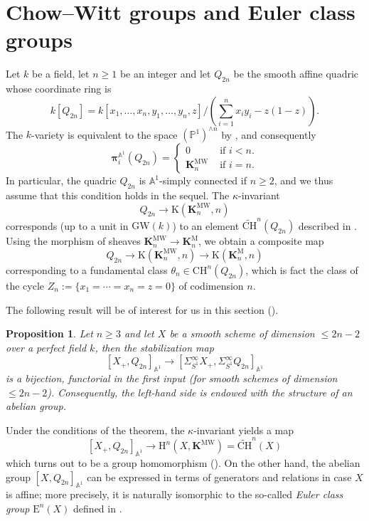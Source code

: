 \documentclass[11pt,leqno]{amsart}
\newcommand{\A}{{\mathbb A}}
\newcommand{\aone}{{\mathbb A}^1}
\newcommand{\pone}{{\mathbb P}^1}
\renewcommand{\1}{{\rm 1\hspace*{-0.4ex}%
\rule{0.1ex}{1.52ex}\hspace*{0.2ex}}}
\newcommand{\bpi}{\bm{\pi}}
\newcommand{\piaone}{{\bpi}^{\aone}}
\newcommand{\CHW}{{\widetilde{\mathrm{CH}}}}
\newcommand{\CH}{{\mathrm{CH}}}
\newcommand{\K}{{{\mathbf K}}}
\newcommand{\KMW}{\K^{\mathrm{MW}}}
\newcommand{\KM}{\K^{\mathrm M}}
\newcommand{\Hr}{{\mathrm {H}}}
\newcommand{\<}[1]{{\langle}#1 {\rangle}}
\theoremstyle{plain}
\newtheorem{prop}[thm]{Proposition}
\theoremstyle{definition}
\theoremstyle{remark}
\numberwithin{equation}{section}
\begin{document}
\section{Chow--Witt groups and Euler class groups}

Let $k$ be a field, let $n\geq 1$ be an integer and let $Q_{2n}$ be the smooth affine quadric whose coordinate ring is 
\[
k[Q_{2n}]=k[x_1,\ldots,x_n,y_1,\ldots,y_n,z]/(\sum_{i=1}^nx_iy_i-z(1-z)).
\]
The $k$-variety is equivalent to the space $(\pone)^{\wedge n}$ by \cite{asokSmoothModelsMotivic2017}, and consequently
\[
\piaone_i(Q_{2n})=\begin{cases} 0 & \text{ if $i<n$.} \\ \KMW_n & \text{ if $i=n$.}\end{cases}
\]
In particular, the quadric $Q_{2n}$ is $\A^1$-simply connected if $n\geq 2$, and we thus assume that this condition holds in the sequel. The $\kappa$-invariant 
\[
Q_{2n}\to \mathrm{K}(\KMW_{n},n) 
\]
corresponds (up to a unit in $\mathrm{GW}(k)$) to an element $\CHW^n(Q_{2n})$ described in \cite[Lemma 1.1.6]{asokEulerClassGroups2021}. Using the morphism of sheaves $\KMW_n\to \KM_n$, we obtain a composite map 
\[
Q_{2n}\to \mathrm{K}(\KMW_{n},n)\to \mathrm{K}(\KM_{n},n)
\]
corresponding to a fundamental class $\theta_n\in \CH^n(Q_{2n})$, which is fact the class of the cycle $Z_n:=\{x_1=\cdots=x_n=z=0\}$ of codimension $n$.

The following result will be of interest for us in this section (\cite[Proposition 1.2.2]{asokEulerClassGroups2021}).

\begin{prop}
Let $n\geq 3$ and let $X$ be a smooth scheme of dimension $\leq 2n-2$ over a perfect field $k$, then the stabilization map
\[
[X_+,Q_{2n}]_{\A^1}\to [\Sigma_{S^1}^\infty X_+,\Sigma_{S^1}^\infty Q_{2n}]_{\A^1}
\]
is a bijection, functorial in the first input (for smooth schemes of dimension $\leq 2n-2$). Consequently, the left-hand side is endowed with the structure of an abelian group.
\end{prop}

Under the conditions of the theorem, the $\kappa$-invariant yields a map 
\[
[X_+,Q_{2n}]_{\A^1}\to \Hr^n(X,\KMW)=\CHW^n(X)
\]
which turns out to be a group homomorphism (\cite[p. 2791]{asokEulerClassGroups2021}). On the other hand, the abelian group $[X,Q_{2n}]_{\A^1}$ can be expressed in terms of generators and relations in case $X$ is affine; more precisely, it is naturally isomorphic to the so-called \emph{Euler class group} $\mathrm{E}^{n}(X)$ defined in \cite{bhatwadekarEulerClassesStably2002}.  
\end{document}
